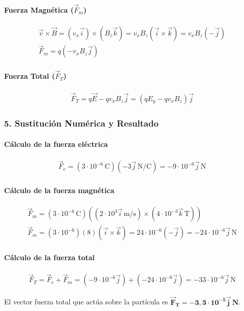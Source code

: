 \paragraph{Fuerza Magnética ($\vec{F}_m$)}
\begin{gather}
    \vec{v} \times \vec{B} = (v_x\vec{i}) \times (B_z\vec{k}) = v_x B_z (\vec{i} \times \vec{k}) = v_x B_z (-\vec{j}) \\
    \vec{F}_m = q ( -v_x B_z \vec{j} )
\end{gather}
\paragraph{Fuerza Total ($\vec{F}_T$)}
\begin{gather}
    \vec{F}_T = q\vec{E} - q v_x B_z \vec{j} = (qE_y - qv_x B_z)\vec{j}
\end{gather}

\subsubsection*{5. Sustitución Numérica y Resultado}
\paragraph{Cálculo de la fuerza eléctrica}
\begin{gather}
    \vec{F}_e = (3 \cdot 10^{-6}\,\text{C})(-3\vec{j}\,\text{N/C}) = -9 \cdot 10^{-6}\vec{j}\,\text{N}
\end{gather}
\paragraph{Cálculo de la fuerza magnética}
\begin{gather}
    \vec{F}_m = (3 \cdot 10^{-6}\,\text{C})((2 \cdot 10^3 \vec{i}\,\text{m/s}) \times (4 \cdot 10^{-3} \vec{k}\,\text{T})) \\
    \vec{F}_m = (3 \cdot 10^{-6}) (8) (\vec{i} \times \vec{k}) = 24 \cdot 10^{-6} (-\vec{j}) = -24 \cdot 10^{-6}\vec{j}\,\text{N}
\end{gather}
\paragraph{Cálculo de la fuerza total}
\begin{gather}
    \vec{F}_T = \vec{F}_e + \vec{F}_m = (-9 \cdot 10^{-6}\vec{j}) + (-24 \cdot 10^{-6}\vec{j}) = -33 \cdot 10^{-6}\vec{j}\,\text{N}
\end{gather}
\begin{cajaresultado}
El vector fuerza total que actúa sobre la partícula es $\boldsymbol{\vec{F}_T = -3,3 \cdot 10^{-5}\vec{j}\,\textbf{N}}$.
\end{cajaresultado}

